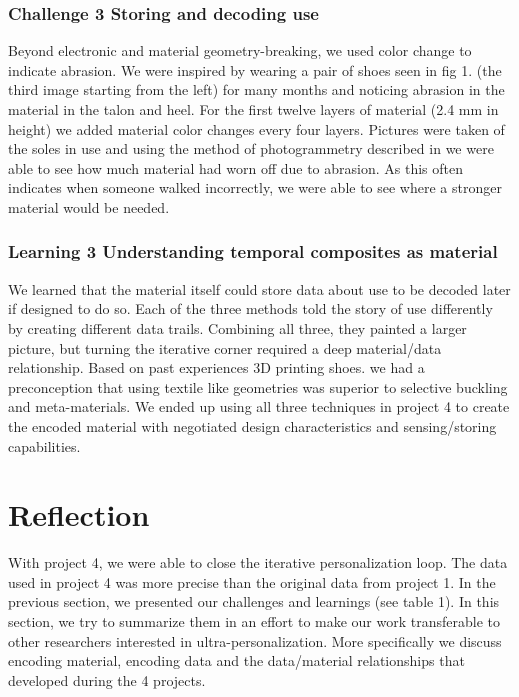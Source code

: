 \subsubsection{Challenge 3 Storing and decoding use}

Beyond electronic and material geometry-breaking, we used color change to indicate abrasion. We were inspired by wearing a pair of shoes seen in fig 1. (the third image starting from the left) for many months and noticing abrasion in the material in the talon and heel. For the first twelve layers of material (2.4 mm in height) we added material color changes every four layers. Pictures were taken of the soles in use and using the method of photogrammetry described in \cite{Nachtigall2017} we were able to see how much material had worn off due to abrasion. As this often indicates when someone walked incorrectly, we were able to see where a stronger material would be needed. 

\subsubsection{Learning 3 Understanding temporal composites as material}

We learned that the material itself could store data about use to be decoded later if designed to do so. Each of the three methods told the story of use differently by creating different data trails. Combining all three, they painted a larger picture, but turning the iterative corner required a deep material/data relationship. Based on past experiences 3D printing shoes. we had a preconception that using textile like geometries was superior to selective buckling and meta-materials. We ended up using all three techniques in project 4 to create the encoded material with negotiated design characteristics and sensing/storing capabilities. 

\section{Reflection }
With project 4, we were able to close the iterative personalization loop. The data used in project 4 was more precise than the original data from project 1. In the previous section, we presented our challenges and learnings (see table 1). In this section, we try to summarize them in an effort to make our work transferable to other researchers interested in ultra-personalization. More specifically we discuss encoding material, encoding data and the data/material relationships that developed during the 4 projects.

